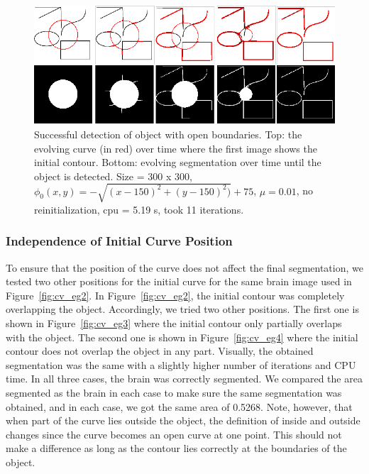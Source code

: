 \documentclass[10pt,twocolumn,letterpaper]{article}
\begin{document}
\begin{figure}[t]
\centering
\includegraphics[width=12cm]{cv_eg8.png}
\caption{Successful detection of object with open boundaries. Top: the evolving curve (in red) over time where the first image shows the initial contour.
Bottom: evolving segmentation over time until the object is detected. Size = 300 x 300, $\phi_{0}(x,y) = - \sqrt{(x - 150)^2 + (y - 150)^2)} + 75$, $\mu =
0.01$, no reinitialization, cpu = 5.19 s, took 11 iterations.}
\label{fig:cv_eg8}
\end{figure}


\subsubsection*{Independence of Initial Curve Position}

To ensure that the position of the curve does not affect the final segmentation, we tested two other positions for the initial curve for the same brain image
used in Figure~\ref{fig:cv_eg2}. In Figure~\ref{fig:cv_eg2}, the initial contour was completely overlapping the object. Accordingly, we tried two other
positions. The first one is shown in Figure~\ref{fig:cv_eg3} where the initial contour only partially overlaps with the object. The second one is shown in
Figure~\ref{fig:cv_eg4} where the initial contour does not overlap the object in any part. Visually, the obtained segmentation was the same with a slightly
higher number of iterations and CPU time. In all three cases, the brain was correctly segmented. We compared the area segmented as the brain in each case to
make sure the same segmentation was obtained, and in each case, we got the same area of 0.5268. Note, however, that when part of the curve lies outside the
object, the definition of inside and outside changes since the curve becomes an open curve at one point. This should not make a difference as long as the
contour lies correctly at the boundaries of the object. 
\end{document}

